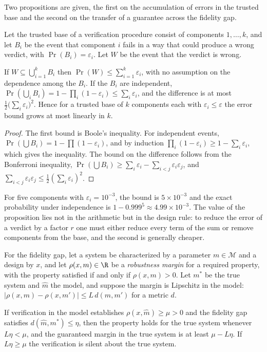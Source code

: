 Two propositions are given, the first on the accumulation of errors in the trusted base and the second on the transfer of a guarantee across the fidelity gap.

Let the trusted base of a verification procedure consist of components $1,\dots,k$, and let $B_i$ be the event that component $i$ fails in a way that could produce a wrong verdict, with $\Pr(B_i)=\varepsilon_i$. Let $W$ be the event that the verdict is wrong.

\begin{proposition}
If $W\subseteq\bigcup_{i=1}^kB_i$ then $\Pr(W)\le\sum_{i=1}^k\varepsilon_i$, with no assumption on the dependence among the $B_i$. If the $B_i$ are independent, $\Pr(\bigcup_iB_i)=1-\prod_i(1-\varepsilon_i)\le\sum_i\varepsilon_i$, and the difference is at most $\tfrac12\bigl(\sum_i\varepsilon_i\bigr)^2$. Hence for a trusted base of $k$ components each with $\varepsilon_i\le\varepsilon$ the error bound grows at most linearly in $k$.
\end{proposition}

\begin{proof}
The first bound is Boole's inequality. For independent events, $\Pr(\bigcup B_i)=1-\prod(1-\varepsilon_i)$, and by induction $\prod_i(1-\varepsilon_i)\ge1-\sum_i\varepsilon_i$, which gives the inequality. The bound on the difference follows from the Bonferroni inequality, $\Pr(\bigcup B_i)\ge\sum_i\varepsilon_i-\sum_{i<j}\varepsilon_i\varepsilon_j$, and $\sum_{i<j}\varepsilon_i\varepsilon_j\le\tfrac12(\sum_i\varepsilon_i)^2$.
\end{proof}

For five components with $\varepsilon_i=10^{-3}$, the bound is $5\times10^{-3}$ and the exact probability under independence is $1-0.999^5\approx4.99\times10^{-3}$. The value of the proposition lies not in the arithmetic but in the design rule: to reduce the error of a verdict by a factor $r$ one must either reduce every term of the sum or remove components from the base, and the second is generally cheaper.

For the fidelity gap, let a system be characterized by a parameter $m\in\mathcal M$ and a design by $x$, and let $\rho(x,m)\in\R$ be a \emph{robustness margin} for a required property, with the property satisfied if and only if $\rho(x,m)>0$. Let $m^\ast$ be the true system and $\hat m$ the model, and suppose the margin is Lipschitz in the model: $|\rho(x,m)-\rho(x,m')|\le L\,d(m,m')$ for a metric $d$.

\begin{proposition}
If verification in the model establishes $\rho(x,\hat m)\ge\mu>0$ and the fidelity gap satisfies $d(\hat m,m^\ast)\le\eta$, then the property holds for the true system whenever $L\eta<\mu$, and the guaranteed margin in the true system is at least $\mu-L\eta$. If $L\eta\ge\mu$ the verification is silent about the true system.
\end{proposition}

